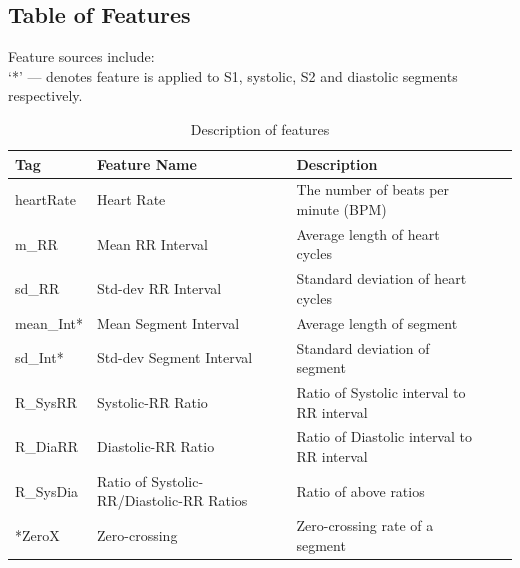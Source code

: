 \documentclass[titlepage, 12pt]{scrartcl} \usepackage{enumitem}
\begin{document}
\subsection{Table of Features}\label{appendixA}
\begin{table}[H]
\centering
\caption{Description of features}
\scriptsize
Feature sources include:~\parencite{Homsi2016, Schmidt2015, Liang1998,
Lerch2012}\\

`*' --- denotes feature is applied to S1, systolic, S2 and diastolic segments
respectively.
\onehalfspacing
\tiny
\label{my-label}
\begin{tabulary}{\linewidth}{LLLLL}
\hline
Tag                        & Feature Name                                    & Description                                                                          \\ \hline
heartRate                  & Heart Rate                                      & The number of beats per minute (BPM)                                                 \\
m\_RR                      & Mean RR Interval                                & Average length of heart cycles                                                       \\
sd\_RR                     & Std-dev RR Interval                             & Standard deviation of heart cycles                                                   \\
mean\_Int*                 & Mean Segment Interval                           & Average length of segment                                                            \\
sd\_Int*                   & Std-dev Segment Interval                        & Standard deviation of segment                                                        \\
R\_SysRR                   & Systolic-RR Ratio                               & Ratio of Systolic interval to RR interval                                            \\
R\_DiaRR                   & Diastolic-RR Ratio                              & Ratio of Diastolic interval to RR interval                                           \\
R\_SysDia                  & Ratio of Systolic-RR/Diastolic-RR Ratios        & Ratio of above ratios                                                                \\
*ZeroX                     & Zero-crossing                                   & Zero-crossing rate of a segment                                                      \\

\end{tabulary}
\end{table}
\end{document}

